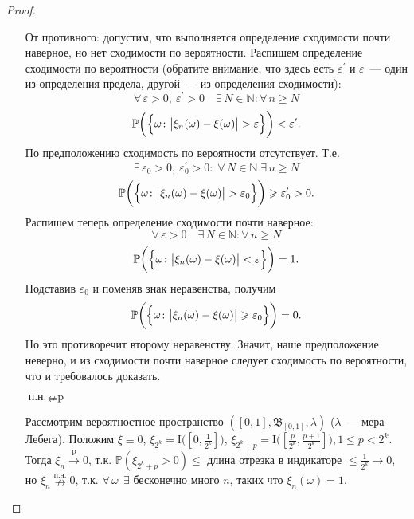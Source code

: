 \begin{proof}
\begin{itemize}
        От противного: допустим, что выполняется определение сходимости почти наверное, но нет сходимости по вероятности.
        Распишем определение сходимости по вероятности (обратите внимание, что здесь есть $\varepsilon^\prime$ и $\varepsilon$~--- один из определения предела, другой~--- из определения сходимости):
        $$ \forall \, \varepsilon > 0, \: \varepsilon^\prime > 0 \quad \exists \, N \in \mathbb{N}\colon \forall \, n \geqslant N $$
        $$ \mathbb{P} \biggl( \Bigl\{ \omega \colon \bigl| \xi_n(\omega) - \xi(\omega) \bigr| > \varepsilon  \Bigr\}\biggr) < \varepsilon^\prime.$$
        По предположению сходимость по вероятности отсутствует. Т.е.
        $$ \exists \, \varepsilon_0 > 0, \: \varepsilon_0^\prime > 0 \colon \; \forall \, N \in \mathbb{N} \; \exists \, n \geqslant N $$
        $$ \mathbb{P} \biggl( \Bigl\{ \omega \colon \bigl| \xi_n(\omega) - \xi(\omega) \bigr| > \varepsilon_0 \Bigr\}\biggr) \geqslant \varepsilon_0^\prime > 0.$$
        Распишем теперь определение сходимости почти наверное:
        $$ \forall \, \varepsilon > 0 \quad \exists \, N \in \mathbb{N} \colon \forall \, n \geqslant N $$
        $$ \mathbb{P} \biggl( \Bigl\{ \omega \colon \bigl| \xi_n(\omega) - \xi(\omega) \bigr| < \varepsilon \Bigr\} \biggr) = 1.$$
        Подставив $\varepsilon_0$ и поменяв знак неравенства, получим
        $$ \mathbb{P} \biggl( \Bigl\{ \omega \colon \bigl| \xi_n(\omega) - \xi(\omega) \bigr| \geqslant \varepsilon_0 \Bigr\} \biggr) = 0.$$
        Но это противоречит второму неравенству. 
        Значит, наше предположение неверно, и из сходимости почти наверное следует сходимость по вероятности, что и требовалось доказать.

    \item[$\text{п.н.} \nLeftarrow \text{p}$]
    
        Рассмотрим вероятностное пространство $([0, 1], \mathfrak{B}_{[0, 1]}, \lambda)$ ($\lambda$~--- мера Лебега).
        Положим $\xi \equiv 0, \, \xi_{2^{k}}=\mathrm{I}\bigl(\left[0, \frac{1}{2^{k}}\right]\bigr), \, \xi_{2^{k}+p}=\mathrm{I}\bigl(\left[\frac{p}{2^{k}}, \frac{p+1}{2^{k}}\right]\bigr), 1 \leqslant p<2^{k}.$ 
        Тогда $\xi_n \xrightarrow[]{\text{p}} 0$, т.к. $\mathbb{P}(\xi_{2^k + p} > 0) \leqslant$ длина отрезка в индикаторе $\leqslant \frac{1}{2^k} \rightarrow 0$, но $\xi_n \overset{\text{п.н.}}{\nrightarrow} 0$, т.к. $\forall \, \omega~~\exists$ бесконечно много $n$, таких что $\xi_n(\omega) = 1.$

    

\end{itemize}
\end{proof}
